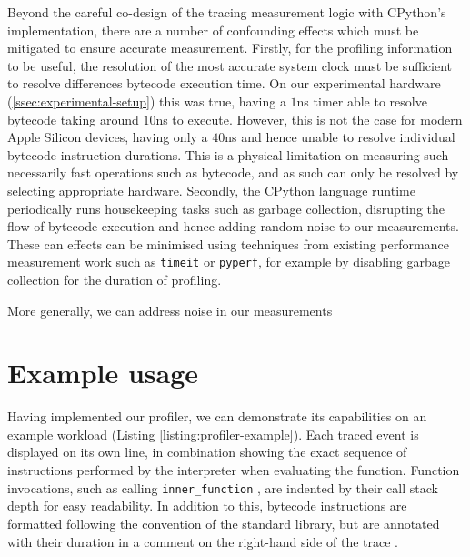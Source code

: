 Beyond the careful co-design of the tracing measurement logic with CPython's implementation, there are a number of confounding effects which must be mitigated to ensure accurate measurement.
Firstly, for the profiling information to be useful, the resolution of the most accurate system clock must be sufficient to resolve differences bytecode execution time. On our experimental hardware (\autoref{ssec:experimental-setup}) this was true, having a $1$ns timer able to resolve bytecode taking around $10$ns to execute. However, this is not the case for modern Apple Silicon devices, having only a $40$ns and hence unable to resolve individual bytecode instruction durations. This is a physical limitation on measuring such necessarily fast operations such as bytecode, and as such can only be resolved by selecting appropriate hardware.
Secondly, the CPython language runtime periodically runs housekeeping tasks such as garbage collection, disrupting the flow of bytecode execution and hence adding random noise to our measurements. These can effects can be minimised using techniques from existing performance measurement work such as \texttt{timeit} or \texttt{pyperf}, for example by disabling garbage collection for the duration of profiling.

More generally, we can address noise in our measurements





\section{Example usage}
\label{sec:profiling-bytecode-examples}

Having implemented our profiler, we can demonstrate its capabilities on an example workload (Listing \ref{listing:profiler-example}).
Each traced event is displayed on its own line, in combination showing the exact sequence of instructions performed by the interpreter when evaluating the function. Function invocations, such as calling \texttt{inner\_function} , are indented by their call stack depth for easy readability. In addition to this, bytecode instructions are formatted following the convention of the standard library, but are annotated with their duration in a comment on the right-hand side of the trace .


